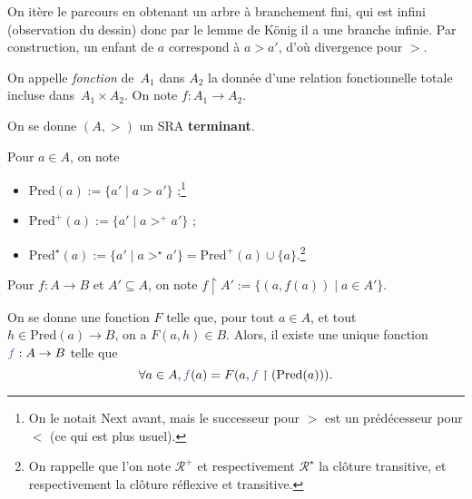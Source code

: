 \documentclass[../main]{subfiles}
\begin{document}
\begin{prv}
\begin{itemize}
        On itère le parcours en obtenant un arbre à branchement fini, qui est infini (observation du dessin) donc par le lemme de König il a une branche infinie.
        Par construction, un enfant de $a$ correspond à $a > a'$, d'où divergence pour $>$.
    \end{itemize}
  \end{prv}

  \begin{thm}
    On appelle \textit{fonction} de~$A_1$ dans $A_2$ la donnée d'une relation fonctionnelle totale incluse dans~$A_1 \times A_2$.
    On note $f : A_1 \to A_2$.

    On se donne $(A, >)$ un SRA \textbf{terminant}.

    Pour $a \in A$, on note 
    \begin{itemize}
      \item $\mathrm{Pred}(a) := \{a'  \mid a > a'\}$ ;\footnote{On le notait $\mathrm{Next}$ avant, mais le successeur pour $>$ est un prédécesseur pour $<$ (ce qui est plus usuel).}
      \item $\mathrm{Pred}^+(a) := \{a'  \mid a >^+ a'\}$ ;
      \item $\mathrm{Pred}^\star(a) := \{a'  \mid a >^\star a'\} = \mathrm{Pred}^+(a) \cup \{a\}$.\footnote{On rappelle que l'on note $\mathcal{R}^+$ et respectivement $\mathcal{R}^\star$ la clôture transitive, et respectivement la clôture réflexive et transitive.}
    \end{itemize}

    Pour $f : A \to B$ et $A' \subseteq A$, on note $f \upharpoonright A' := \{(a, f(a))  \mid a \in A'\}$.

    On se donne une fonction $F$ telle que, pour tout $a \in A$, et tout~$h \in \mathrm{Pred}(a) \to B$, on a $F(a,h) \in B$.
    Alors, il existe une unique fonction ${\color{deepblue} f} : A \to B$ telle que \[
      \forall a \in A, {\color{deepblue} f}(a) = F(a, {\color{deepblue} f} \upharpoonright(\mathrm{Pred}(a)))
    .\] 
  \end{thm}
\end{document}
